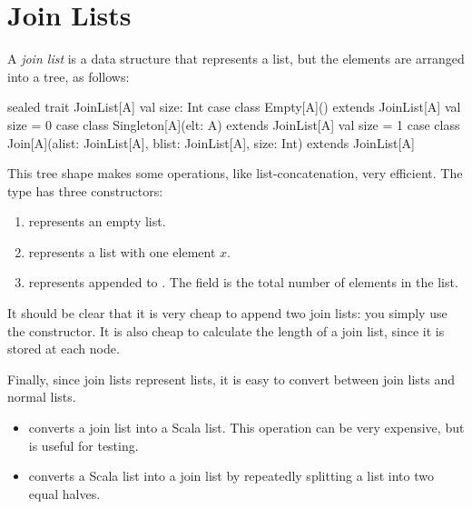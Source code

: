 \section{Join Lists}

A \emph{join list} is a data structure that represents a list, but the
elements are arranged into a tree, as follows:

\begin{scalacode}
sealed trait JoinList[A] { val size: Int }
case class Empty[A]() extends JoinList[A] { val size = 0 }
case class Singleton[A](elt: A) extends JoinList[A] { val size = 1 }
case class Join[A](alist: JoinList[A], blist: JoinList[A], size: Int) extends JoinList[A]
\end{scalacode}

This tree shape makes some operations, like list-concatenation, very
efficient.  The type has three constructors:

\begin{enumerate}

\item {} represents an empty list.

\item {} represents a list with one element $x$.

\item {} represents  appended to
       . The  field is the total
       number of elements in the list.

\end{enumerate}

It should be clear that it is very cheap to append two join lists: you simply
use the  constructor. It is also cheap to calculate the length of a
join list, since it is stored at each node.


Finally, since join lists represent lists, it is easy to convert between
join lists and normal lists.
%
\begin{itemize}

\item {} converts a join list into a Scala
  list.  This operation can be very expensive, but is useful for
  testing.

\item {} converts a Scala list into a join
  list by repeatedly splitting a list into two equal halves.

\end{itemize}

